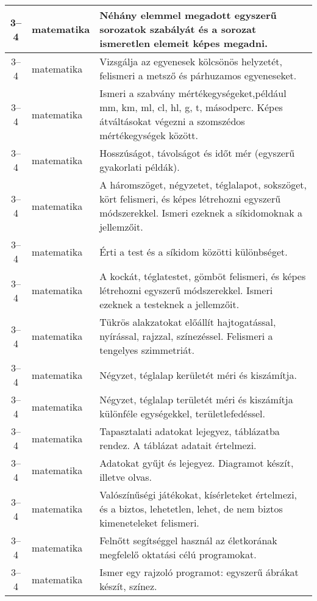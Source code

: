 \begin{small}
\begin{longtable}{c | p{2cm} |  p{11cm} }
              3--4 & matematika & Néhány elemmel megadott egyszerű sorozatok szabályát és a sorozat ismeretlen elemeit képes megadni. \\ \hline
              3--4 & matematika & Vizsgálja az egyenesek kölcsönös helyzetét, felismeri a metsző és párhuzamos egyeneseket. \\ \hline
              3--4 & matematika & Ismeri a szabvány mértékegységeket,például mm, km, ml, cl, hl, g, t, másodperc. Képes átváltásokat végezni a szomszédos mértékegységek között. \\ \hline
              3--4 & matematika & Hosszúságot, távolságot és időt mér (egyszerű gyakorlati példák). \\ \hline
              3--4 & matematika & A háromszöget, négyzetet, téglalapot, sokszöget, kört felismeri, és képes létrehozni egyszerű módszerekkel. Ismeri ezeknek a síkidomoknak a jellemzőit. \\ \hline
              3--4 & matematika & Érti a test és a síkidom közötti különbséget. \\ \hline
              3--4 & matematika & A kockát, téglatestet, gömböt felismeri, és képes létrehozni egyszerű módszerekkel. Ismeri ezeknek a testeknek a jellemzőit. \\ \hline
              3--4 & matematika & Tükrös alakzatokat  előállít hajtogatással, nyírással, rajzzal, színezéssel. Felismeri a tengelyes szimmetriát. \\ \hline
              3--4 & matematika & Négyzet, téglalap kerületét méri és kiszámítja. \\ \hline
              3--4 & matematika & Négyzet, téglalap területét méri és kiszámítja különféle egységekkel, területlefedéssel. \\ \hline
              3--4 & matematika & Tapasztalati adatokat lejegyez, táblázatba rendez. A táblázat adatait értelmezi. \\ \hline
              3--4 & matematika & Adatokat gyűjt és lejegyez. Diagramot készít, illetve olvas. \\ \hline
              3--4 & matematika & Valószínűségi játékokat, kísérleteket értelmezi, és a biztos, lehetetlen, lehet, de nem biztos kimeneteleket felismeri. \\ \hline
              3--4 & matematika & Felnőtt segítséggel használ az életkorának megfelelő oktatási célú programokat. \\ \hline
              3--4 & matematika & Ismer egy rajzoló programot: egyszerű ábrákat készít, színez.
 \\ \hline

\end{longtable}
\end{small}
